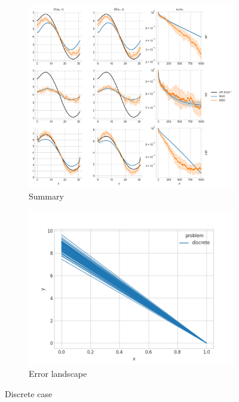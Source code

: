 \documentclass[11pt]{article}
\begin{document}
\begin{figure}[h!]
    \centering
    \begin{subfigure}{.9\textwidth}
      \centering
      \includegraphics[width=\linewidth]{../figs/Q_ctrl_SGD_vs_CBO_summary_discrete_tabular.png}
      \caption{Summary}
      \label{fig:summary_disc}
    \end{subfigure}
    \begin{subfigure}{.5\textwidth}
      \centering
      \includegraphics[width=\linewidth]{../figs/Q_ctrl_landscape_plot_discrete_tabular.png}
      \caption{Error landscape}
      \label{fig:error_landscape_disc}
    \end{subfigure}
    \caption{Discrete case}
    \label{fig:disc}
\end{figure}
\end{document}
